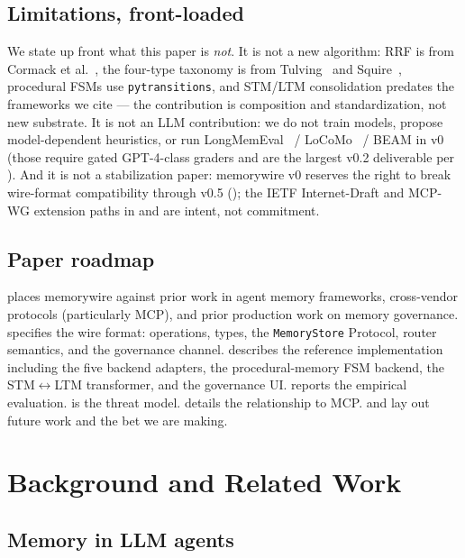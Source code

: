 \documentclass[11pt,letterpaper,twocolumn]{article}
\begin{document}
\subsection{Limitations, front-loaded}
\label{sec:intro-limitations}

We state up front what this paper is \emph{not}. It is not a new algorithm: RRF is from Cormack et al.~\cite{cormack2009rrf}, the four-type taxonomy is from Tulving~\cite{tulving1972episodic} and Squire~\cite{squire1992declarative}, procedural FSMs use \texttt{pytransitions}, and STM/LTM consolidation predates the frameworks we cite --- the contribution is composition and standardization, not new substrate. It is not an LLM contribution: we do not train models, propose model-dependent heuristics, or run LongMemEval~\cite{wu2024longmemeval} / LoCoMo~\cite{maharana2024locomo} / BEAM in v0 (those require gated GPT-4-class graders and are the largest v0.2 deliverable per ). And it is not a stabilization paper: memorywire v0 reserves the right to break wire-format compatibility through v0.5 (); the IETF Internet-Draft and MCP-WG extension paths in  and  are intent, not commitment.

\subsection{Paper roadmap}
\label{sec:intro-roadmap}

 places memorywire against prior work in agent memory frameworks, cross-vendor protocols (particularly MCP), and prior production work on memory governance.  specifies the wire format: operations, types, the \texttt{MemoryStore} Protocol, router semantics, and the governance channel.  describes the reference implementation including the five backend adapters, the procedural-memory FSM backend, the STM$\leftrightarrow$LTM transformer, and the governance UI.  reports the empirical evaluation.  is the threat model.  details the relationship to MCP.  and  lay out future work and the bet we are making.

\section{Background and Related Work}
\label{sec:related}

\subsection{Memory in LLM agents}
\end{document}

